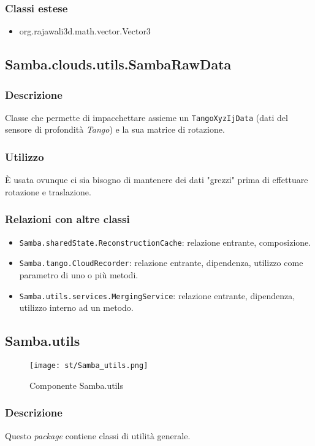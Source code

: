 \subsubsection{Classi estese}
\begin{itemize}
	\item org.rajawali3d.math.vector.Vector3
\end{itemize}

\subsection{Samba.clouds.utils.SambaRawData}
\subsubsection{Descrizione}
Classe che permette di impacchettare assieme un \texttt{TangoXyzIjData} (dati del sensore di profondità \emph{Tango}) e la sua matrice di rotazione.
\subsubsection{Utilizzo}
È usata ovunque ci sia bisogno di mantenere dei dati "grezzi" prima di effettuare rotazione e traslazione.
\subsubsection{Relazioni con altre classi}
\begin{itemize}
	\item \texttt{Samba.sharedState.ReconstructionCache}: relazione entrante, composizione.
	\item \texttt{Samba.tango.CloudRecorder}: relazione entrante, dipendenza, utilizzo come parametro di uno o più metodi.
	\item \texttt{Samba.utils.services.MergingService}: relazione entrante, dipendenza, utilizzo interno ad un metodo.	
\end{itemize}


\subsection{Samba.utils}
\begin{figure}[!h] 
    \centering 
    \texttt{[image: st/Samba\_utils.png]} 
    \caption{Componente Samba.utils}
\end{figure}
\subsubsection{Descrizione}
Questo \emph{package} contiene classi di utilità generale.
